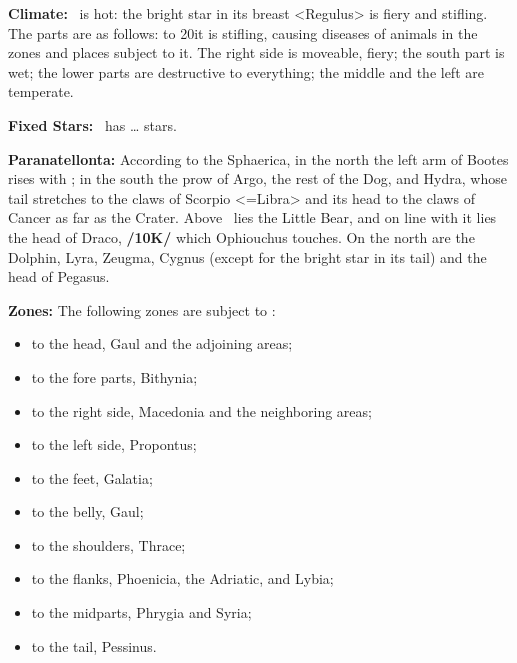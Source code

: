 \textbf{Climate:} \Leo\, is hot: the bright star in its breast <Regulus> is fiery and stifling. The parts are as follows: to 20\deg it is stifling, causing diseases of animals in the zones and places subject to it. The right side is moveable, fiery; the south part is wet; the lower parts are destructive to everything; the middle and the left are temperate.

\textbf{Fixed Stars:} \Leo\, has … stars. 

\textbf{Paranatellonta:} According to the Sphaerica, in the north the left arm of Bootes rises with \Leo; in the south the prow of Argo, the rest of the Dog, and Hydra, whose tail stretches to the claws of Scorpio <=Libra> and its head to the claws of Cancer as far as the Crater. Above \Leo\, lies the Little Bear, and on line with it lies the head of Draco, \textbf{/10K/} which Ophiouchus touches. On the north are the Dolphin, Lyra, Zeugma, Cygnus (except for the bright star in its tail) and the head of Pegasus.

\textbf{Zones: } The following zones are subject to \Leo: 
\begin{itemize}
\item to the head, Gaul and the adjoining areas; 
\item to the fore parts, Bithynia; 
\item to the right side, Macedonia and the neighboring areas; \item to the left side, Propontus; 
\item to the feet, Galatia; 
\item to the belly, Gaul; 
\item to the shoulders, Thrace; 
\item to the flanks, Phoenicia, the Adriatic, and Lybia; 
\item to the midparts, Phrygia and Syria; 
\item to the tail, Pessinus.
\end{itemize}

